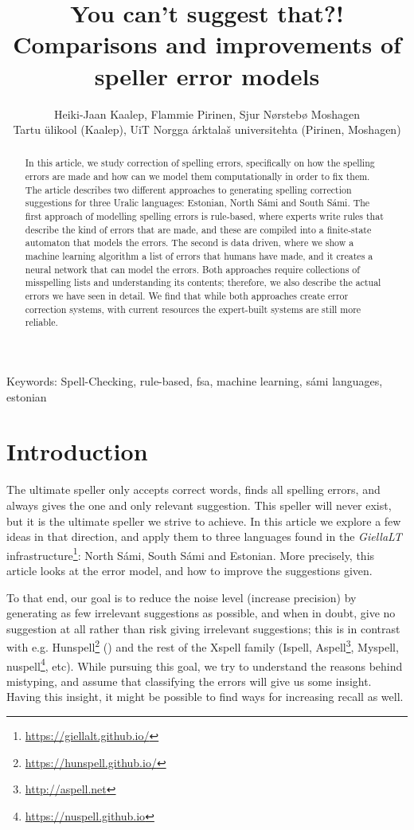 \documentclass{flammie}
\title{You can't suggest that?! \\ Comparisons and improvements of speller error
models}
\author{Heiki-Jaan Kaalep, Flammie Pirinen, Sjur Nørstebø Moshagen\\
Tartu ülikool (Kaalep), UiT Norgga árktalaš universitehta (Pirinen, Moshagen)}
\providecommand{\keywords}[1]
{
  \small
  Keywords: #1
}
\begin{document}
\setcounter{page}{125}

\maketitle

\begin{abstract}
\noindent
In this article, we study correction of spelling errors, specifically on how the
    spelling errors are made and how can we model them computationally in order
    to fix them.  The article describes two different approaches to generating
    spelling correction suggestions for three Uralic languages: Estonian, North
    Sámi and South Sámi.  The first approach of modelling spelling errors is
    rule-based, where experts write rules that describe the kind of errors that
    are made, and these are compiled into a finite-state automaton that models
    the errors.  The second is data driven, where we show a machine learning
    algorithm a list of errors that humans have made, and it creates a neural
    network that can model the errors.  Both approaches require collections of
    misspelling lists and understanding its contents; therefore, we also
    describe the actual errors we have seen in detail.  We find that while both
    approaches create error correction systems, with current resources the
    expert-built systems are still more reliable.
\end{abstract}

\keywords{Spell-Checking, rule-based, fsa, machine learning, sámi languages, estonian}

\section[Introduction]{Introduction}

The ultimate speller only accepts correct words, finds all spelling errors, and
always gives the one and only relevant suggestion. This speller will never
exist, but it is the ultimate speller we strive to achieve. In this article we
explore a few ideas in that direction, and apply them to three languages found
in the \textit{GiellaLT}
infrastructure\footnote{\url{https://giellalt.github.io/}}: North Sámi, South
Sámi and Estonian. More precisely, this article looks at the error model, and
how to improve the suggestions given.

To that end, our goal is to reduce the noise level (increase precision) by
generating as few irrelevant suggestions as possible, and when in doubt, give no
suggestion at all rather than risk giving irrelevant suggestions; this is in
contrast with e.g. Hunspell\footnote{\url{https://hunspell.github.io/}}
(\cite{hunmorph}) and the rest of the Xspell family (Ispell,
Aspell\footnote{\url{http://aspell.net}}, Myspell,
nuspell\footnote{\url{https://nuspell.github.io}}, etc). While pursuing this
goal, we try to understand the reasons behind mistyping, and assume that
classifying the errors will give us some insight. Having this insight, it might
be possible to find ways for increasing recall as well.
\end{document}
